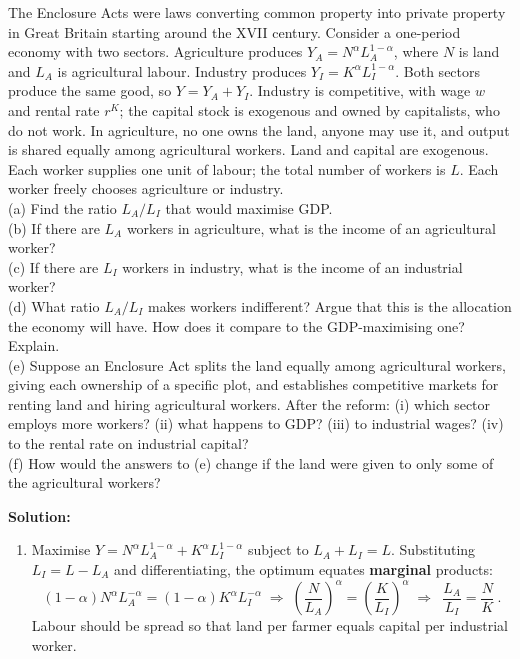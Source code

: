 \documentclass[12pt, letterpaper]{article}
\begin{document}
\begin{tcolorbox}[oddbox,title={Problem 9.13 \quad The Enclosure Acts}]
\begin{tcolorbox}[questionbox]
The Enclosure Acts were laws converting common property into private property in Great Britain
starting around the XVII century. Consider a one-period economy with two sectors. Agriculture
produces $Y_A=N^\alpha L_A^{1-\alpha}$, where $N$ is land and $L_A$ is agricultural labour.
Industry produces $Y_I=K^\alpha L_I^{1-\alpha}$. Both sectors produce the same good, so
$Y=Y_A+Y_I$. Industry is competitive, with wage $w$ and rental rate $r^K$; the capital stock is
exogenous and owned by capitalists, who do not work. In agriculture, no one owns the land,
anyone may use it, and output is shared equally among agricultural workers. Land and capital
are exogenous. Each worker supplies one unit of labour; the total number of workers is $L$.
Each worker freely chooses agriculture or industry.\\[3pt]
(a) Find the ratio $L_A/L_I$ that would maximise GDP.\\
(b) If there are $L_A$ workers in agriculture, what is the income of an agricultural worker?\\
(c) If there are $L_I$ workers in industry, what is the income of an industrial worker?\\
(d) What ratio $L_A/L_I$ makes workers indifferent? Argue that this is the allocation the
economy will have. How does it compare to the GDP-maximising one? Explain.\\
(e) Suppose an Enclosure Act splits the land equally among agricultural workers, giving each
ownership of a specific plot, and establishes competitive markets for renting land and hiring
agricultural workers. After the reform: (i) which sector employs more workers? (ii) what happens
to GDP? (iii) to industrial wages? (iv) to the rental rate on industrial capital?\\
(f) How would the answers to (e) change if the land were given to only some of the agricultural
workers?
\end{tcolorbox}

\textbf{Solution:}

\begin{enumerate}
\item Maximise $Y=N^\alpha L_A^{1-\alpha}+K^\alpha L_I^{1-\alpha}$ subject to $L_A+L_I=L$.
Substituting $L_I=L-L_A$ and differentiating, the optimum equates \textbf{marginal} products:
\[
(1-\alpha)N^{\alpha}L_A^{-\alpha}=(1-\alpha)K^{\alpha}L_I^{-\alpha}
\;\Longrightarrow\;
\left(\frac{N}{L_A}\right)^{\alpha}=\left(\frac{K}{L_I}\right)^{\alpha}
\;\Longrightarrow\;
\boxed{\ \frac{L_A}{L_I}=\frac{N}{K}\ }.
\]
Labour should be spread so that land per farmer equals capital per industrial worker.


\end{enumerate}
\end{tcolorbox}
\end{document}

